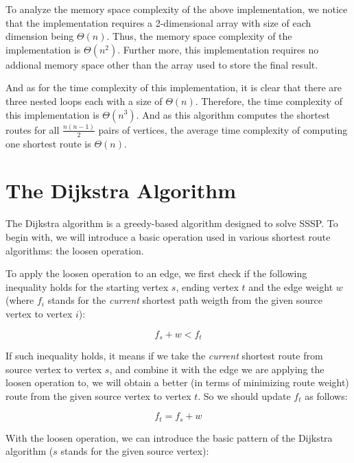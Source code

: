 \documentclass[a4paper,11pt,twocolumn]{article}
\begin{document}
To analyze the memory space complexity of the above implementation, we notice that the implementation requires a 2-dimensional array with size of each dimension being $\Theta(n)$. Thus, the memory space complexity of the implementation is $\Theta(n^2)$. Further more, this implementation requires no addional memory space other than the array used to store the final result.

And as for the time complexity of this implementation, it is clear that there are three nested loops each with a size of $\Theta(n)$. Therefore, the time complexity of this implementation is $\Theta(n^3)$. And as this algorithm computes the shortest routes for all $\frac{n(n-1)}{2}$ pairs of vertices, the average time complexity of computing one shortest route is $\Theta(n)$.

\section{The Dijkstra Algorithm}

The Dijkstra algorithm is a greedy-based algorithm designed to solve SSSP. To begin with, we will introduce a basic operation used in various shortest route algorithms: the loosen operation.

To apply the loosen operation to an edge, we first check if the following inequality holds for the starting vertex $s$, ending vertex $t$ and the edge weight $w$ (where $f_i$ stands for the \emph{current} shortest path weigth from the given source vertex to vertex $i$):

$$f_s+w<f_t$$

If such inequality holds, it means if we take the \emph{current} shortest route from source vertex to vertex $s$, and combine it with the edge we are applying the loosen operation to, we will obtain a better (in terms of minimizing route weight) route from the given source vertex to vertex $t$. So we should update $f_t$ as follows:

$$f_t=f_s+w$$

With the loosen operation, we can introduce the basic pattern of the Dijkstra algorithm ($s$ stands for the given source vertex):
\end{document}
